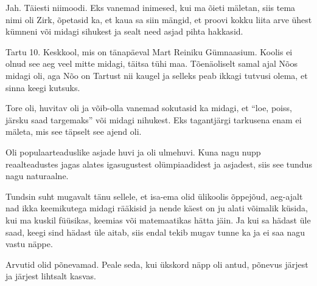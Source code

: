 
Jah. Täiesti niimoodi. Eks vanemad inimesed, kui ma õieti mäletan, siis tema 
nimi oli Zirk, õpetasid ka, et kaua sa siin mängid, et proovi kokku liita arve 
ühest kümneni või midagi sihukest ja sealt need asjad  pihta hakkasid.


Tartu 10. Keskkool, mis on tänapäeval  Mart 
Reiniku Gümnaasium. Koolis ei olnud see aeg veel mitte midagi,  täitsa tühi maa. 
Tõenäoliselt samal ajal Nõos midagi oli, aga Nõo on Tartust nii kaugel ja 
selleks peab ikkagi tutvusi olema, et sinna keegi kutsuks.


Tore oli, huvitav oli ja võib-olla vanemad sokutasid ka midagi, et 
\enquote{loe, poiss, järsku saad targemaks} või midagi nihukest. Eks  
tagantjärgi tarkusena enam ei mäleta, mis see täpselt see ajend oli.


Oli populaarteaduslike asjade huvi ja oli ulmehuvi. Kuna nagu nupp 
reaalteadustes jagas alates igasugustest  olümpiaadidest ja asjadest, siis see 
tundus nagu naturaalne. 


Tundsin suht mugavalt tänu sellele, et isa-ema olid ülikoolis õppejõud, 
aeg-ajalt nad ikka keemikutega midagi  rääkisid ja nende käest on ju alati 
võimalik küsida, kui ma kuskil füüsikas, keemias või matemaatikas hätta jäin. 
Ja kui sa hädast üle saad, keegi sind hädast üle aitab, siis  endal tekib mugav 
tunne ka ja ei saa nagu vastu näppe.


Arvutid olid põnevamad. Peale seda, kui ükskord näpp oli antud, põnevus järjest 
ja järjest lihtsalt kasvas.


